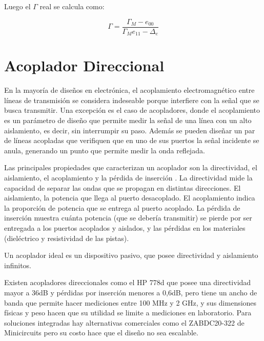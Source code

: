 Luego el $\Gamma$ real se calcula como:

\begin{equation}
    \Gamma= \frac{\Gamma_{M}-e_{00}}{\Gamma_{M}e_{11}-\Delta_{e}} \label{eq:correcciongamma}
\end{equation}

 
\section{Acoplador Direccional}
En la mayoría de diseños en electrónica, el acoplamiento electromagnético entre líneas de transmisión se considera indeseable porque interfiere con la señal que se busca transmitir. Una excepción es el caso de acopladores, donde el acoplamiento es un parámetro de diseño que permite medir la señal de una línea con un alto aislamiento, es decir, sin interrumpir su paso. Además se pueden diseñar un par de líneas acopladas que verifiquen que en uno de sus puertos la señal incidente se anula, generando un punto que permite medir la onda reflejada. 

Las principales propiedades que caracterizan un acoplador son la directividad, el aislamiento, el acoplamiento y la pérdida de inserción \cite{acopladores_minicircuits}. La directividad mide la capacidad de separar las ondas que se propagan en distintas direcciones. El aislamiento, la potencia que llega al puerto desacoplado. El acoplamiento indica la proporción de potencia que se entrega al puerto acoplado. La pérdida de inserción muestra cuánta potencia (que se debería transmitir) se pierde por ser entregada a los puertos acoplados y aislados, y las pérdidas en los materiales (dieléctrico y resistividad de las pistas). 

Un acoplador ideal es un dispositivo pasivo, que posee directividad y aislamiento infinitos. 

Existen acopladores direccionales como el HP 778d \cite{keysight_778d} que posee una directividad mayor a 36dB y pérdidas por inserción menores a 0,6dB, pero tiene un ancho de banda que permite hacer mediciones entre 100 MHz y 2 GHz, y sus dimensiones físicas y peso hacen que su utilidad se limite a mediciones en laboratorio. Para soluciones integradas hay alternativas comerciales como el ZABDC20-322 de Minicircuits \cite{minicircuits_zabdc20} pero su costo hace que el diseño no sea escalable. 

